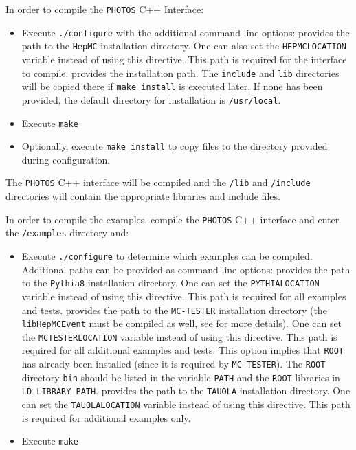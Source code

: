 \documentclass[]{Photos_interface_design}
\begin{document}
In order to compile the {\tt PHOTOS} C++ Interface:
\begin{itemize}
 \item Execute {\tt ./configure} with the additional command line options:
    provides the path to the {\tt HepMC} installation directory. One can also set the {\tt HEPMCLOCATION} variable instead of using this directive. This path is required for the interface to compile.
    provides the installation path. The {\tt include} and {\tt lib} directories will be copied there if {\tt make install} is executed later. If none has been provided, the default directory for installation is {\tt /usr/local}.
 \item Execute {\tt make}
 \item Optionally, execute {\tt make install} to copy files to the directory provided during configuration.
\end{itemize}

The {\tt PHOTOS} C++ interface will be compiled and the {\tt /lib} and {\tt /include} directories will contain the appropriate libraries and include files.

In order to compile the examples, compile the {\tt PHOTOS} C++ interface and enter the {\tt /examples} directory and:
\begin{itemize}
  \item Execute {\tt ./configure} to determine which examples can be compiled.
        Additional paths can be provided as command line options:
    provides the path to the {\tt Pythia8} installation
            directory. One can set the {\tt PYTHIALOCATION} variable instead of using this directive.
            This path is required for all examples and tests.
    provides the path to the {\tt MC-TESTER} installation
            directory (the {\tt libHepMCEvent} must be compiled as well, see \cite{Davidson:2008ma}
			for more details). One can set the {\tt MCTESTERLOCATION} variable instead of using this
			directive. This path is required for all additional examples and tests.  This option
			implies that {\tt ROOT} has already been installed (since it is required by {\tt MC-TESTER}).
			The {\tt ROOT} directory {\tt bin} should be listed in the variable {\tt PATH} and the {\tt ROOT}
			libraries in {\tt LD\_LIBRARY\_PATH}.
    provides the path to the {\tt TAUOLA} installation directory.
            One can set the {\tt TAUOLALOCATION} variable instead of using this directive.
			This path is required for additional examples only.
  \item Execute {\tt make}
\end{itemize}
\end{document}
